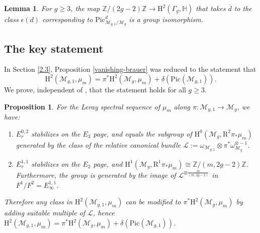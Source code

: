 \documentclass[12pt]{amsart}
\newtheorem{lemma}{Lemma}
\newtheorem{proposition}{Proposition}
\begin{document}
\begin{lemma}{\cite[Theorem 24]{zbMATH01590471}}\label{Hain-lemma} For $g\geq3$, the map $\mathbb{Z}/(2g-2)\mathbb{Z}\to\mathrm{H}^2(\Gamma_g,\mathbb{H})$ that takes $\overline{d}$ to the class $\epsilon(d)$ corresponding to $\mathrm{Pic}^d_{\mathcal{M}_{g,1}/\mathcal{M}_g}$ is a group isomorphism.
\end{lemma}

\subsection{The key statement} In Section \ref{2.3}, Proposition \ref{vanishing-brauer} was reduced to the statement that $$\mathrm{H}^2(\mathcal{M}_{g,1},\mu_m)=\pi^*\mathrm{H}^2(\mathcal{M}_g,\mu_m)+\delta(\mathrm{Pic}(\mathcal{M}_{g,1})).$$
We prove, independent of \cite[Theorem 4.1]{zbMATH07456405}, that the statement holds for all $g\geq3$.
\begin{proposition}\label{add}For the Leray spectral sequence of $\mu_m$ along $\pi\colon \mathcal{M}_{g,1}\to\mathcal{M}_g$, we have:
\begin{enumerate}
\item $E_r^{0,2}$ stabilizes on the $E_3$ page, and equals the subgroup of $\mathrm{H}^0(\mathcal{M}_{g},\mathrm{R}^2\pi_*\mu_m)$ generated by the class of the relative canonical bundle $\mathcal{L}:=\omega_{\mathcal{M}_{g,1}}\otimes\pi^*\omega_{\mathcal{M}_{g}}^{\otimes-1}$.
\item $E_r^{1,1}$ stabilizes on the $E_2$ page, and $\mathrm{H}^1(\mathcal{M}_g,\mathrm{R}^1\pi_*\mu_m)\cong\mathbb{Z}/(m,2g-2)\mathbb{Z}$. Furthermore, the group is generated by the image of $\mathcal{L}^{\otimes \frac{m}{(m,2g-2)}}$ in $F^1/F^2=E_\infty^{1,1}$.
\end{enumerate}
Therefore any class in $\mathrm{H}^2(\mathcal{M}_{g,1},\mu_m)$ can be modified to $\pi^*\mathrm{H}^2(\mathcal{M}_{g},\mu_m)$ by adding suitable multiple of $\mathcal{L}$, hence $\mathrm{H}^2(\mathcal{M}_{g,1},\mu_m)=\pi^*\mathrm{H}^2(\mathcal{M}_{g},\mu_m)+\delta(\mathrm{Pic}(\mathcal{M}_{g,1}))$.
\end{proposition}
\end{document}
